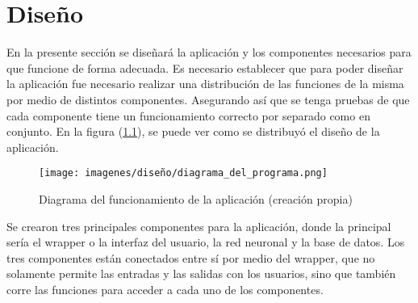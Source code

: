   \chapter{Diseño}
\label{C:desarrollo}

En la presente sección se diseñará la aplicación y los componentes necesarios para que funcione de forma adecuada. Es necesario establecer que para poder diseñar la aplicación fue necesario realizar una distribución de las funciones de la misma por medio de distintos componentes. Asegurando así que se tenga pruebas de que cada componente tiene un funcionamiento correcto por separado como en conjunto. En la figura (\ref{appdiagram}), se puede ver como se distribuyó el diseño de la aplicación.
\begin{figure}[H]
    \centering
    \texttt{[image: imagenes/diseño/diagrama\_del\_programa.png]}
    \caption{Diagrama del funcionamiento de la aplicación (creación propia)}
    \label{appdiagram}
\end{figure}
\par
Se crearon tres principales componentes para la aplicación, donde la principal sería el wrapper o la interfaz del usuario, la red neuronal y la base de datos. Los tres componentes están conectados entre sí por medio del wrapper, que no solamente permite las entradas y las salidas con los usuarios, sino que también corre las funciones para acceder a cada uno de los componentes.

